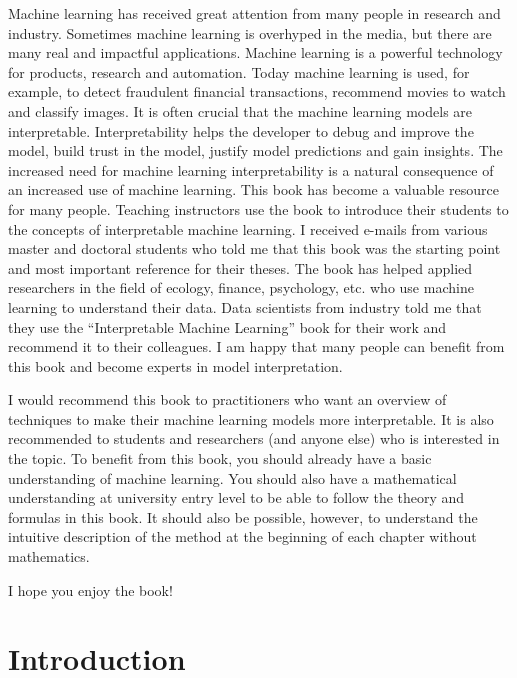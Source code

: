 \documentclass[
  12pt,
]{krantz}
\begin{document}
Machine learning has received great attention from many people in research and industry.
Sometimes machine learning is overhyped in the media, but there are many real and impactful applications.
Machine learning is a powerful technology for products, research and automation.
Today machine learning is used, for example, to detect fraudulent financial transactions, recommend movies to watch and classify images.
It is often crucial that the machine learning models are interpretable.
Interpretability helps the developer to debug and improve the model, build trust in the model, justify model predictions and gain insights.
The increased need for machine learning interpretability is a natural consequence of an increased use of machine learning.
This book has become a valuable resource for many people.
Teaching instructors use the book to introduce their students to the concepts of interpretable machine learning.
I received e-mails from various master and doctoral students who told me that this book was the starting point and most important reference for their theses.
The book has helped applied researchers in the field of ecology, finance, psychology, etc. who use machine learning to understand their data.
Data scientists from industry told me that they use the ``Interpretable Machine Learning'' book for their work and recommend it to their colleagues.
I am happy that many people can benefit from this book and become experts in model interpretation.

I would recommend this book to practitioners who want an overview of techniques to make their machine learning models more interpretable.
It is also recommended to students and researchers (and anyone else) who is interested in the topic.
To benefit from this book, you should already have a basic understanding of machine learning.
You should also have a mathematical understanding at university entry level to be able to follow the theory and formulas in this book.
It should also be possible, however, to understand the intuitive description of the method at the beginning of each chapter without mathematics.

I hope you enjoy the book!

\mainmatter

\hypertarget{intro}{%
\chapter{Introduction}\label{intro}}
\end{document}
